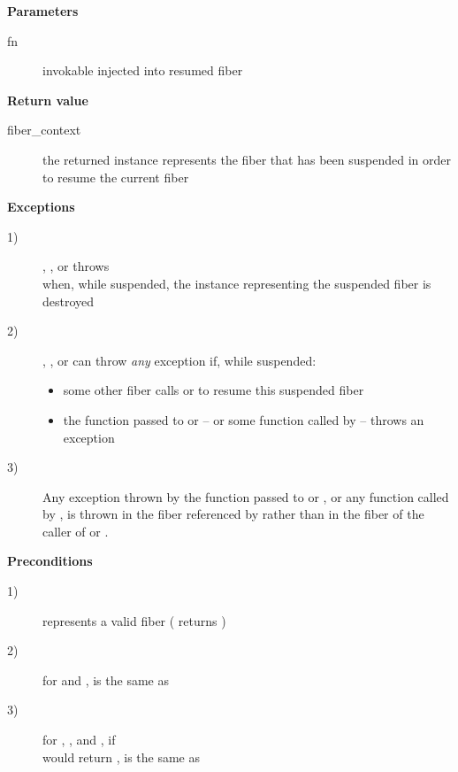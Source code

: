 {\bfseries Parameters}
\begin{description}
    \item[fn] invokable injected into resumed fiber\\
\end{description}

{\bfseries Return value}
\begin{description}
    \item[fiber\_context] the returned instance represents the fiber that has been
                 suspended in order to resume the current fiber
\end{description}

{\bfseries Exceptions}
\begin{description}
    \item[1)] \resume, \resumewith, \xtresume or \xtresumewith throws\\
              \unwindex when, while suspended, the \fiber instance representing
              the suspended fiber is destroyed
    \item[2)] \resume, \resumewith, \xtresume or \xtresumewith can
              throw \emph{any} exception if, while suspended:
              \begin{itemize}
                  \item some other fiber calls \resumewith or \xtresumewith to
                        resume this suspended fiber
                  \item the function  passed to \resumewith
                        or \xtresumewith -- or some function called
                        by  -- throws an exception
              \end{itemize}
    \item[3)] Any exception thrown by the function  passed
              to \resumewith or \xtresumewith, or any function called
              by , is thrown in the fiber referenced by 
              rather than in the fiber of the caller of \resumewith
              or \xtresumewith.
\end{description}

{\bfseries Preconditions}
\begin{description}
    \item[1)]  represents a valid fiber ( returns )
    \item[2)] for \resume and \resumewith, \currthread is the same as
              \lastthread
    \item[3)] for \resume, \resumewith, \xtresume and \xtresumewith, if\\
              \canxtresume would return , \currthread is
              the same as \lastthread
\end{description}

